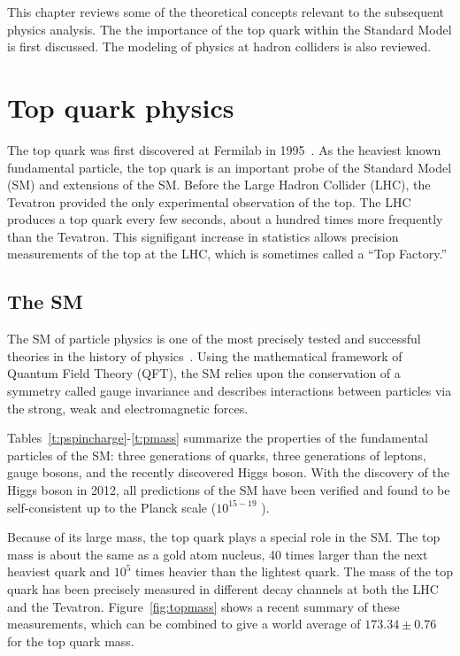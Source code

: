 

This chapter reviews some of the theoretical concepts relevant to the subsequent physics analysis. The the importance of the top quark within the Standard Model is first discussed. The modeling of physics at hadron colliders is also reviewed.

\section{Top quark physics}
The top quark was first discovered at Fermilab in 1995~\cite{Abe:1995hr}\cite{Abachi:1995iq}. As the heaviest known fundamental particle, the top quark is an important probe of the Standard Model (SM) and extensions of the SM. Before the Large Hadron Collider (LHC), the Tevatron provided the only experimental observation of the top. The LHC produces a top quark every few seconds, about a hundred times more frequently than the Tevatron. This signifigant increase in statistics allows precision measurements of the top at the LHC, which is sometimes called a ``Top Factory.'' 

\subsection{The SM}

The SM of particle physics is one of the most precisely tested and successful theories in the history of physics~\cite{peskin}. Using the mathematical framework of Quantum Field Theory (QFT), the SM relies upon the conservation of a symmetry called gauge invariance and describes interactions between particles via the strong, weak and electromagnetic forces.  

Tables~\ref{t:pspincharge}-\ref{t:pmass} summarize the properties of the fundamental particles of the SM: three generations of quarks, three generations of leptons, gauge bosons, and the recently discovered Higgs boson. With the discovery of the Higgs boson in 2012, all predictions of the SM have been verified and found to be self-consistent up to the Planck scale ($10^{15-19}$ \gev). 

Because of its large mass, the top quark plays a special role in the SM. The top mass is about the same as a gold atom nucleus, 40 times larger than the next heaviest quark and $10^5$ times heavier than the lightest quark. The mass of the top quark has been precisely measured in different decay channels at both the LHC and the Tevatron. Figure~\ref{fig:topmass} shows a recent summary of these measurements, which can be combined to give a world average of $173.34 \pm 0.76$ for the top quark mass.


